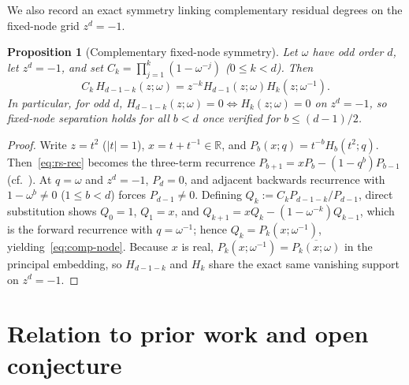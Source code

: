 \documentclass[11pt,reqno]{amsart}
\numberwithin{equation}{section}
\newtheorem{proposition}[theorem]{Proposition}
\theoremstyle{definition}
\theoremstyle{remark}
\newcommand{\R}{\mathbb{R}}
\begin{document}
We also record an exact symmetry linking complementary residual degrees on the fixed-node grid $z^d=-1$.

\begin{proposition}[Complementary fixed-node symmetry]
\label{prop:comp-node}
Let $\omega$ have odd order $d$, let $z^d=-1$, and set $C_k = \prod_{j=1}^k(1-\omega^{-j})$ ($0\le k<d$). Then
\begin{equation}
\label{eq:comp-node}
C_k\, H_{d-1-k}(z;\omega) = z^{-k} H_{d-1}(z;\omega) H_k(z;\omega^{-1}).
\end{equation}
In particular, for odd $d$, $H_{d-1-k}(z;\omega)=0 \iff H_k(z;\omega)=0$ on $z^d=-1$, so fixed-node separation holds for all $b<d$ once verified for $b\le (d-1)/2$.
\end{proposition}

\begin{proof}
Write $z=t^2$ ($|t|=1$), $x=t+t^{-1}\in\R$, and $P_b(x;q)=t^{-b}H_b(t^2;q)$. Then~\eqref{eq:rs-rec} becomes the three-term recurrence $P_{b+1}=xP_b-(1-q^b)P_{b-1}$ (cf.~\cite{AKK09,dBS86}). At $q=\omega$ and $z^d=-1$, $P_d=0$, and adjacent backwards recurrence with $1-\omega^b\neq 0$ ($1\le b<d$) forces $P_{d-1}\neq 0$. Defining $Q_k := C_k P_{d-1-k}/P_{d-1}$, direct substitution shows $Q_0=1$, $Q_1=x$, and $Q_{k+1}=xQ_k-(1-\omega^{-k})Q_{k-1}$, which is the forward recurrence with $q=\omega^{-1}$; hence $Q_k = P_k(x;\omega^{-1})$, yielding~\eqref{eq:comp-node}. Because $x$ is real, $P_k(x;\omega^{-1})=\overline{P_k(x;\omega)}$ in the principal embedding, so $H_{d-1-k}$ and $H_k$ share the exact same vanishing support on $z^d=-1$.
\end{proof}

\section{Relation to prior work and open conjecture}
\label{sec:prior}
\end{document}
